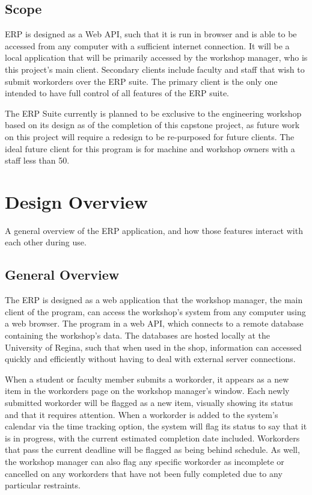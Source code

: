 \subsection{Scope}
ERP is designed as a Web API, such that it is run in browser and is able to be accessed from any computer with a sufficient internet connection. It will be a local application that will be primarily accessed by the workshop manager, who is this project's main client. Secondary clients include faculty and staff that wish to submit workorders over the ERP suite. The primary client is the only one intended to have full control of all features of the ERP suite. 
\newline
{\setlength{\parindent}{0cm}

The ERP Suite currently is planned to be exclusive to the engineering workshop based on its design as of the completion of this capstone project, as future work on this project will require a redesign to be re-purposed for future clients. The ideal future client for this program is for machine and workshop owners with a staff less than 50.  

\newpage

\section{Design Overview}
A general overview of the ERP application, and how those features interact with each other during use. 

\subsection{General Overview}

The ERP is designed as a web application that the workshop manager, the main client of the program, can access the workshop's system from any computer using a web browser. The program in a web API, which connects to a remote database containing the workshop's data. The databases are hosted locally at the University of Regina, such that when used in the shop, information can accessed quickly and efficiently without having to deal with external server connections. 
\newline
{\setlength{\parindent}{0cm}

When a student or faculty member submits a workorder, it appears as a new item in the workorders page on the workshop manager's window. Each newly submitted workorder will be flagged as a new item, visually showing its status and that it requires attention. When a workorder is added to the system's calendar via the time tracking option, the system will flag its status to say that it is in progress, with the current estimated completion date included. Workorders that pass the current deadline will be flagged as being behind schedule. As well, the workshop manager can also flag any specific workorder as incomplete or cancelled on any workorders that have not been fully completed due to any particular restraints.
\newline
{\setlength{\parindent}{0cm}

}}}
